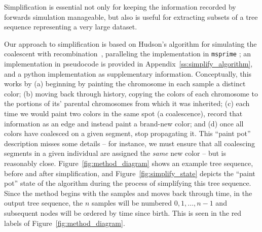 \documentclass{article}
\newcommand{\msprime}{\texttt{msprime}}
\begin{document}
Simplification is essential
not only for keeping the information recorded by forwards simulation manageable,
but also is useful for extracting subsets of a tree sequence representing a very large dataset.

Our approach to simplification is based on Hudson's algorithm for simulating
the coalescent with recombination~\citep{hudson1983properties},
paralleling the implementation in \msprime{} \citep{kelleher2016efficient};
an implementation in pseudocode is provided in Appendix~\ref{ss:simplify_algorithm},
and a python implementation as supplementary information.
Conceptually, this works by
(a) beginning by painting the chromosome in each sample a distinct color;
(b) moving back through history,
copying the colors of each chromosome to the portions of its' parental chromosomes
from which it was inherited;
(c) each time we would paint two colors in the same spot (a coalescence),
record that information as an edge and instead paint a brand-new color;
and
(d) once all colors have coalesced on a given segment,
stop propagating it.
This ``paint pot'' description misses some details --
for instance, we must ensure that all coalescing segments in a given individual
are assigned the \emph{same} new color --
but is reasonably close.
Figure~\ref{fig:method_diagram} shows an example tree sequence,
before and after simplification,
and Figure~\ref{fig:simplify_state} depicts the ``paint pot'' state of the algorithm
during the process of simplifying this tree sequence.
Since the method begins with the samples and moves back through time,
in the output tree sequence, the $n$ samples will be numbered $0, 1, \ldots, n-1$
and subsequent nodes will be ordered by time since birth.
This is seen in the red labels of Figure~\ref{fig:method_diagram}.
\end{document}
